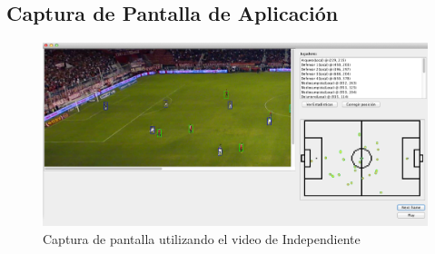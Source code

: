 \newpage
\begin{appendices}
\chapter{Captura de Pantalla de Aplicación}

\begin{figure}[H]
  \centering
  \includegraphics[width=\linewidth]{./images/Screen-Indep.png}
  \caption{Captura de pantalla utilizando el video de Independiente}
\end{figure}

\end{appendices}

